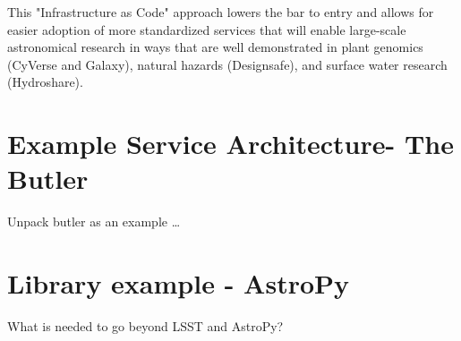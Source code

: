 This "Infrastructure as Code" \citep{morris2016infrastructure} approach lowers the bar to entry
and allows for easier adoption of more standardized services that will enable large-scale
astronomical research in ways that are well demonstrated in plant genomics (CyVerse and Galaxy), natural hazards (Designsafe), and surface water research (Hydroshare).


\section{Example Service Architecture- The Butler}
Unpack butler as an example …

\section{Library example - AstroPy}
What is needed to go beyond LSST and AstroPy?


